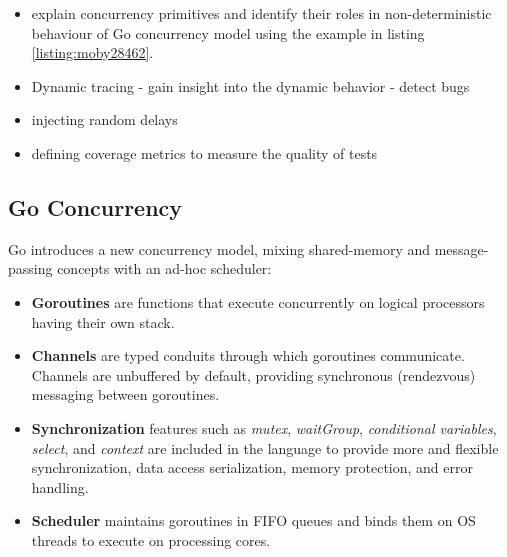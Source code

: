 
\begin{itemize}
  \item explain concurrency primitives and identify their roles in non-deterministic behaviour of Go concurrency model using the example in listing \ref{listing:moby28462}.
  \item Dynamic tracing - gain insight into the dynamic behavior - detect bugs
  \item injecting random delays
  \item defining coverage metrics to measure the quality of tests
\end{itemize}

\subsection{Go Concurrency}
%
Go introduces a new concurrency model, mixing shared-memory and message-passing concepts with an ad-hoc scheduler:
\begin{itemize}
    \item \textbf{Goroutines} are functions that execute concurrently on logical processors having their own stack.
    \item \textbf{Channels} are typed conduits through which goroutines communicate.  Channels are unbuffered by default, providing synchronous (rendezvous) messaging between goroutines.
    \item \textbf{Synchronization} features such as \textit{mutex}, \textit{waitGroup}, \textit{conditional variables}, \textit{select}, and \textit{context} are included in the language to provide more and flexible synchronization, data access serialization, memory protection, and error handling.
    \item \textbf{Scheduler} maintains goroutines in FIFO queues and binds them on OS threads to execute on processing cores.
\end{itemize}


